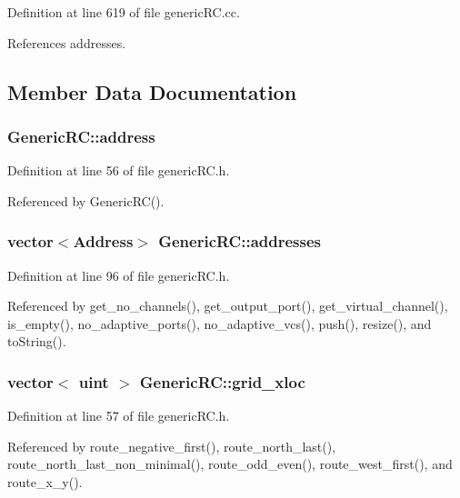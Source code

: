 Definition at line 619 of file genericRC.cc.

References addresses.

\subsection{Member Data Documentation}
\subsubsection[{address}]{ {\bf GenericRC::address}}\label{classGenericRC_5a89c8b3e742b017f108ce1075422526}




Definition at line 56 of file genericRC.h.

Referenced by GenericRC().
\subsubsection[{addresses}]{\setlength{\rightskip}{0pt plus 5cm}vector$<${\bf Address}$>$ {\bf GenericRC::addresses}\hspace{0.3cm}{\tt  [private]}}\label{classGenericRC_5e837760d9c3df33625c4f7c0d0a2c1f}




Definition at line 96 of file genericRC.h.

Referenced by get\_\-no\_\-channels(), get\_\-output\_\-port(), get\_\-virtual\_\-channel(), is\_\-empty(), no\_\-adaptive\_\-ports(), no\_\-adaptive\_\-vcs(), push(), resize(), and toString().
\subsubsection[{grid\_\-xloc}]{\setlength{\rightskip}{0pt plus 5cm}vector$<$ {\bf uint} $>$ {\bf GenericRC::grid\_\-xloc}}\label{classGenericRC_2e2f02ddede7cfafca6073ee559663e2}




Definition at line 57 of file genericRC.h.

Referenced by route\_\-negative\_\-first(), route\_\-north\_\-last(), route\_\-north\_\-last\_\-non\_\-minimal(), route\_\-odd\_\-even(), route\_\-west\_\-first(), and route\_\-x\_\-y().
